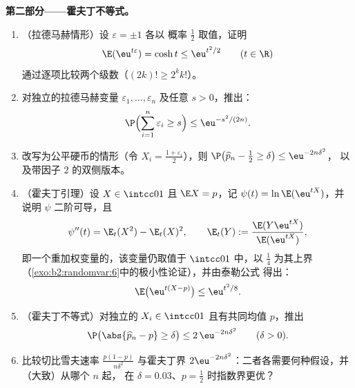 \begin{problem}
\medskip
\noindent\textbf{第二部分——霍夫丁不等式。}
\begin{enumerate}[resume]
  \item （拉德马赫情形）设 $\varepsilon = \pm1$ 各以
        概率 $\frac12$ 取值，证明
        \[
        \E(\eu^{t\varepsilon}) = \cosh t \leq \eu^{t^2/2}
        \qquad (t \in \R)
        \]
        通过逐项比较两个级数（$(2k)! \geq
        2^kk!$）。
  \item 对独立的拉德马赫变量
        $\varepsilon_1, \dots, \varepsilon_n$ 及任意 $s >
        0$，推出：
        \[
        \P\Bigl(\sum_{i=1}^n\varepsilon_i \geq s\Bigr)
        \leq \eu^{-s^2/(2n)} .
        \]
  \item 改写为公平硬币的情形（令 $X_i =
        \frac{1+\varepsilon_i}2$），则 $\P\bigl(\widehat p_n -
        \tfrac12 \geq \delta\bigr) \leq \eu^{-2n\delta^2}$，
        以及带因子 $2$ 的双侧版本。
  \item （霍夫丁引理）设 $X \in \intcc01$ 且 $\E X =
        p$，记 $\psi(t) = \ln\E(\eu^{tX})$，并说明
        $\psi$ 二阶可导，且
        \[
        \psi''(t) = \E_t(X^2) - \E_t(X)^2, \qquad
        \E_t(Y) := \frac{\E(Y\eu^{tX})}{\E(\eu^{tX})},
        \]
        即一个重加权变量的\emph{}，该变量仍取值于
        $\intcc01$ 中，以 $\frac14$ 为其上界
        （\cref{exo:b2:randomvar:6}中的极小性论证），并由泰勒公式
        得出：
        \[
        \E\bigl(\eu^{t(X - p)}\bigr) \leq \eu^{t^2/8} .
        \]
  \item （霍夫丁不等式）对独立的 $X_i \in
        \intcc01$ 且有共同均值 $p$，推出
        \[
        \P\bigl(\abs{\widehat p_n - p} \geq \delta\bigr)
        \leq 2\,\eu^{-2n\delta^2}
        \qquad (\delta > 0).
        \]
  \item 比较切比雪夫速率
        $\frac{p(1-p)}{n\delta^2}$ 与霍夫丁界
        $2\eu^{-2n\delta^2}$：二者各需要何种假设，并
        （大致）从哪个 $n$ 起，
        在 $\delta = 0.03$、$p =
        \frac12$ 时指数界更优？
\end{enumerate}


\end{problem}
